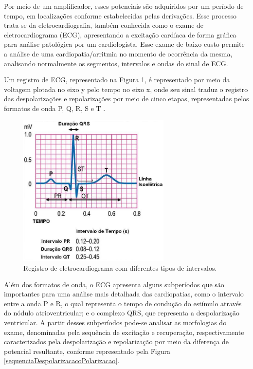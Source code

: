 \documentclass[conference]{IEEEtran}
\begin{document}
Por meio de um amplificador, esses potenciais são adquiridos por um período de tempo, em localizações conforme estabelecidas pelas derivações. Esse processo trata-se da eletrocardiografia, também conhecida como o exame de eletrocardiograma (ECG), apresentando a excitação cardíaca de forma gráfica para análise patológica por um cardiologista. Esse exame de baixo custo permite a análise de uma cardiopatia/arritmia no momento de ocorrência da mesma, analisando normalmente os segmentos, intervalos e ondas do sinal de ECG.

Um registro de ECG, representado na Figura \ref{eletrocardiogramaIntervalos}, é representado por meio da voltagem plotada no eixo y pelo tempo no eixo x, onde seu sinal traduz o registro das despolarizações e repolarizações por meio de cinco etapas, representadas pelos formatos de onda P, Q, R, S e T \cite{mello91}.

\begin{figure}[!h]
	\centering
	\includegraphics[width=3in]{img/eletrocardiogramaIntervalos}
	\caption{Registro de eletrocardiograma com diferentes tipos de intervalos.}
	\label{eletrocardiogramaIntervalos}
\end{figure}

Além dos formatos de onda, o ECG apresenta alguns subperíodos que são importantes para uma análise mais detalhada das cardiopatias, como o intervalo entre a onda P e R, o qual representa o tempo de condução do estímulo através do nódulo atrioventricular; e o complexo QRS, que representa a despolarização ventricular. A partir desses subperíodos pode-se analisar as morfologias do exame, denominadas pela sequência de excitação e recuperação, respectivamente caracterizados pela despolarização e repolarização por meio da
diferença de potencial resultante, conforme representado pela Figura \ref{sequenciaDespolarizacacoPolarizacao}.
\end{document}
